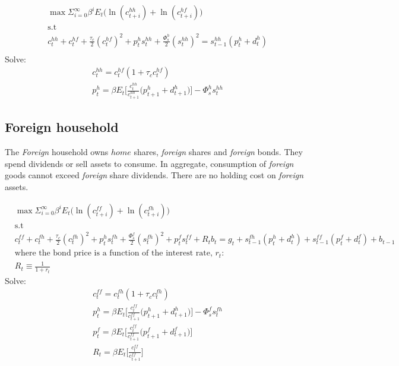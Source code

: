 \documentclass[a4paper]{article}
\begin{document}
\begin{align*}
&\max \Sigma_{i=0}^\infty \beta^i E_t \bigg(\ln(c^{hh}_{t+i})+ \ln(c^{hf}_{t+i}) \bigg)\\ &\text{s.t}\\
&c^{hh}_t+c^{hf}_t + \frac{\tau_c}{2} (c^{hf}_t)^2 + p^{h}_t s^{hh}_t+\frac{\Phi^h_s}{2}(s^{hh}_t)^2 =s^{hh}_{t-1}(p^{h}_t+d^{h}_t)\\
\end{align*}
Solve:
\begin{align}
&c^{hh}_t=c^{hf}_t(1+\tau_c c^{hf}_t)\\
&p^{h}_t=\beta E_t \bigg[\frac{c^{hh}_t}{c^{hh}_{t+1}} \bigg(  p^{h}_{t+1}+d^{h}_{t+1} \bigg) \bigg] - \Phi^h_s s^{hh}_t
\end{align}




















\subsection{Foreign household}
The \emph{Foreign} household owns $home$ shares, \emph{foreign} shares and \emph{foreign} bonds. They spend dividends or sell assets to consume. In aggregate, consumption of \emph{foreign} goods cannot exceed \emph{foreign} share dividends. There are no holding cost on \emph{foreign} assets. 

\begin{align*}
&\max \Sigma_{i=0}^\infty \beta^i E_t \bigg(\ln(c^{ff}_{t+i})+ \ln(c^{fh}_{t+i}) \bigg)\\ &\text{s.t}\\
&c^{ff}_t+c^{fh}_t+\frac{\tau_c}{2}(c^{fh}_t)^2+ p^{h}_t s^{fh}_t+\frac{\Phi^f_s}{2}(s^{fh}_t)^2 + p^{f}_t s^{ff}_t+ R_t b_t=g_t+s^{fh}_{t-1}(p^{h}_t+d^{h}_t)+s^{ff}_{t-1}(p^{f}_t+d^{f}_t)+b_{t-1}\\
& \text{where the bond price is a function of the interest rate, $r_t$:}\\
&R_t \equiv \frac{1}{1+r_t}
\end{align*}
Solve:
\begin{align}
&c^{ff}_t=c^{fh}_t(1+\tau_c c^{fh}_t)\\
&p^{h}_t=\beta E_t \bigg[\frac{c^{ff}_t}{c^{ff}_{t+1}} \bigg(  p^{h}_{t+1}+d^{h}_{t+1} \bigg) \bigg] - \Phi^{f}_s s^{fh}_t\\
&p^{f}_t=\beta E_t \bigg[\frac{c^{ff}_t}{c^{ff}_{t+1}} \bigg(  p^{f}_{t+1}+d^{f}_{t+1} \bigg) \bigg]\\
&R_t=\beta E_t \bigg[\frac{c^{ff}_t}{c^{ff}_{t+1}} \bigg] 
\end{align}
\end{document}
